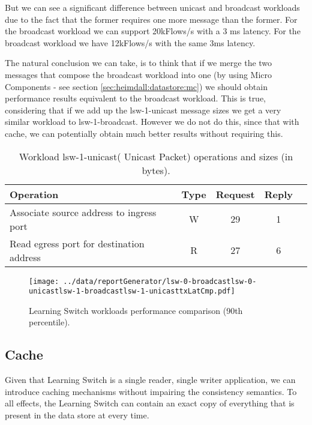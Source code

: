 But we can see a significant difference between unicast and broadcast
workloads due to the fact that the former requires one more message
than the former. For the broadcast workload we can support 20kFlows/s
with a 3 ms latency. For the broadcast workload we have 12kFlows/s
with the same 3ms latency. 

The natural conclusion we can take, is to think that if we merge the
two messages that compose the broadcast workload into one (by using
Micro Components - see section \ref{sec:heimdall:datastore:mc}) we
should obtain performance results equivalent to the broadcast
workload. This is true, considering that if we add up the
lsw-1-unicast message sizes we get a very similar workload to
lsw-1-broadcast. However we do not do this, since that with cache, we
can potentially obtain much better results without requiring this. 

\begin{table}[ht]
\centering 
\begin{tabular}{l c c c c}
 Operation & Type & Request & Reply \\ \toprule 
Associate source address to ingress port & W & 29 & 1\\\midrule
Read egress port for destination address & R & 27 & 6 \\\bottomrule
\end{tabular}
\caption[Workload lsw-1-unicast( Unicast Packet) operations]{Workload lsw-1-unicast( Unicast Packet) operations and sizes (in bytes).}
\label{table:lsw1:unicast}
\end{table}

\begin{figure}[ht]
\centering
\texttt{[image: ../data/reportGenerator/lsw-0-broadcastlsw-0-unicastlsw-1-broadcastlsw-1-unicasttxLatCmp.pdf]}
\caption[Learning Switch workloads performance comparison]{Learning
  Switch workloads performance comparison (90th percentile). }
\label{fig:lsw:comparison}
\end{figure}


\subsection{Cache}
\label{sec.learning.switch.lru.cache} 
\label{sec:feasibility:ls:cache}

Given that Learning Switch is a single reader, single writer
application, we can introduce caching mechanisms without impairing the
consistency semantics. To all effects, the Learning Switch can contain
an exact copy of everything that is present in the data store at every time.

